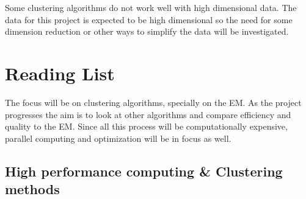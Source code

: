 \documentclass{article}
\begin{document}
Some clustering algorithms do not work well with high dimensional data. The data for this project is expected to be high dimensional so the need for some dimension reduction or other ways to simplify the data will be investigated. 
\pagebreak
\section*{Reading List}
The focus will be on clustering algorithms, specially on the EM. As the project progresses the aim is to look at other algorithms and compare efficiency and quality to the EM. Since all this process will be computationally expensive, parallel computing and optimization will be in focus as well.
\subsection*{High performance computing \& Clustering methods}
\end{document}
